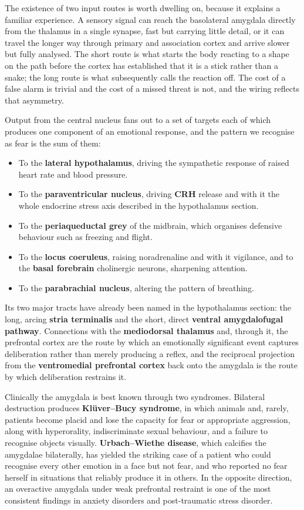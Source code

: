 \documentclass[11pt]{article}
\begin{document}
The existence of two input routes is worth dwelling on, because it explains a familiar experience. A sensory signal can reach the basolateral amygdala directly from the thalamus in a single synapse, fast but carrying little detail, or it can travel the longer way through primary and association cortex and arrive slower but fully analysed. The short route is what starts the body reacting to a shape on the path before the cortex has established that it is a stick rather than a snake; the long route is what subsequently calls the reaction off. The cost of a false alarm is trivial and the cost of a missed threat is not, and the wiring reflects that asymmetry.

Output from the central nucleus fans out to a set of targets each of which produces one component of an emotional response, and the pattern we recognise as fear is the sum of them:

\begin{itemize}
    \item To the \textbf{lateral hypothalamus}, driving the sympathetic response of raised heart rate and blood pressure.
    \item To the \textbf{paraventricular nucleus}, driving \textbf{CRH} release and with it the whole endocrine stress axis described in the hypothalamus section.
    \item To the \textbf{periaqueductal grey} of the midbrain, which organises defensive behaviour such as freezing and flight.
    \item To the \textbf{locus coeruleus}, raising noradrenaline and with it vigilance, and to the \textbf{basal forebrain} cholinergic neurons, sharpening attention.
    \item To the \textbf{parabrachial nucleus}, altering the pattern of breathing.
\end{itemize}

Its two major tracts have already been named in the hypothalamus section: the long, arcing \textbf{stria terminalis} and the short, direct \textbf{ventral amygdalofugal pathway}. Connections with the \textbf{mediodorsal thalamus} and, through it, the prefrontal cortex are the route by which an emotionally significant event captures deliberation rather than merely producing a reflex, and the reciprocal projection from the \textbf{ventromedial prefrontal cortex} back onto the amygdala is the route by which deliberation restrains it.

Clinically the amygdala is best known through two syndromes. Bilateral destruction produces \textbf{Kl\"uver--Bucy syndrome}, in which animals and, rarely, patients become placid and lose the capacity for fear or appropriate aggression, along with hyperorality, indiscriminate sexual behaviour, and a failure to recognise objects visually. \textbf{Urbach--Wiethe disease}, which calcifies the amygdalae bilaterally, has yielded the striking case of a patient who could recognise every other emotion in a face but not fear, and who reported no fear herself in situations that reliably produce it in others. In the opposite direction, an overactive amygdala under weak prefrontal restraint is one of the most consistent findings in anxiety disorders and post-traumatic stress disorder.
\end{document}
